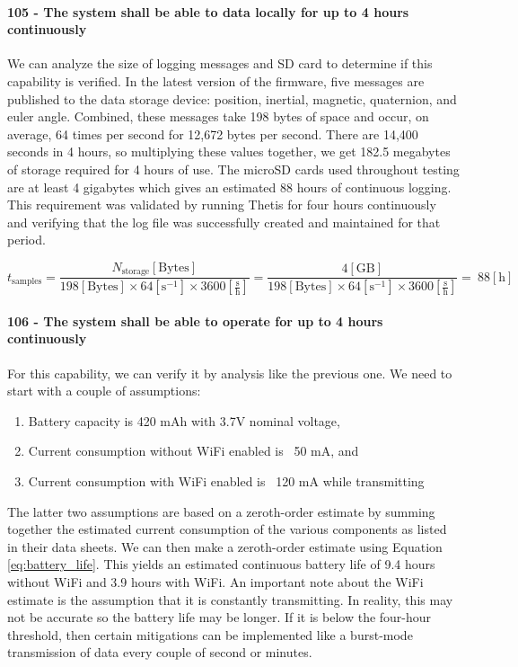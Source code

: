 \paragraph*{105 - The system shall be able to data locally for up to 4 hours continuously} We can analyze the size of logging messages and SD card to determine if this capability is verified.
In the latest version of the firmware, five messages are published to the data storage device: position, inertial, magnetic, quaternion, and euler angle.
Combined, these messages take 198 bytes of space and occur, on average, 64 times per second for 12,672 bytes per second.
There are 14,400 seconds in 4 hours, so multiplying these values together, we get 182.5 megabytes of storage required for 4 hours of use.
The microSD cards used throughout testing are at least 4 gigabytes which gives an estimated 88 hours of continuous logging.
This requirement was validated by running Thetis for four hours continuously and verifying that the log file was successfully created and maintained for that period.

\begin{equation} \label{eq:storage_time}
    t_{\text{samples}} = \frac{N_{\text{storage}} [\text{Bytes}]}{198 [\text{Bytes}] \times 64 [\text{s}^{-1}] \times 3600 \left[\frac{\text{s}}{\text{h}}\right]} = \frac{4 [\text{GB}]}{198 [\text{Bytes}] \times 64 [\text{s}^{-1}] \times 3600 \left[\frac{\text{s}}{\text{h}}\right]} = ~88 [\text{h}]
\end{equation}

\paragraph*{106 - The system shall be able to operate for up to 4 hours continuously} For this capability, we can verify it by analysis like the previous one.
We need to start with a couple of assumptions:

\begin{enumerate}
    \item Battery capacity is 420 mAh with 3.7V nominal voltage,
    \item Current consumption without WiFi enabled is ~50 mA, and
    \item Current consumption with WiFi enabled is ~120 mA while transmitting
\end{enumerate}

The latter two assumptions are based on a zeroth-order estimate by summing together the estimated current consumption of the various components as listed in their data sheets.
We can then make a zeroth-order estimate using Equation \ref{eq:battery_life}.
This yields an estimated continuous battery life of 9.4 hours without WiFi and 3.9 hours with WiFi.
An important note about the WiFi estimate is the assumption that it is constantly transmitting.
In reality, this may not be accurate so the battery life may be longer.
If it is below the four-hour threshold, then certain mitigations can be implemented like a burst-mode transmission of data every couple of second or minutes.


